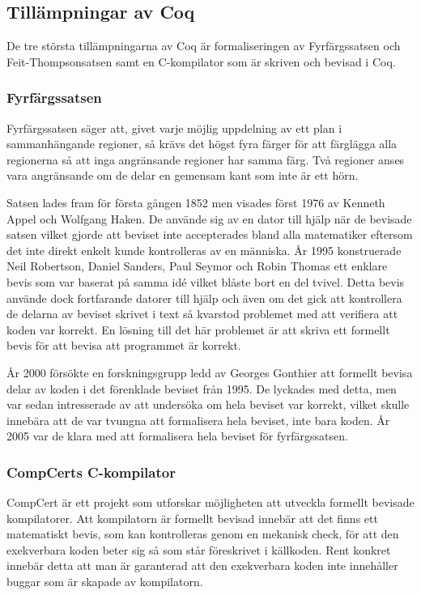 \subsection{Tillämpningar av Coq}
De tre största tillämpningarna av Coq är formaliseringen av Fyrfärgssatsen och
Feit-Thompsonsatsen samt en C-kompilator som är skriven och bevisad i Coq.

\subsubsection{Fyrfärgssatsen}
Fyrfärgssatsen\autocite{gonthier2008formal} säger att, givet varje möjlig
uppdelning av ett plan i sammanhängande regioner, så krävs det högst fyra
färger för att färglägga alla regionerna så att inga angränsande regioner har
samma färg. Två regioner anses vara angränsande om de delar en gemensam kant
som inte är ett hörn.

Satsen lades fram för första gången 1852 men visades först 1976 av Kenneth
Appel och Wolfgang Haken. De använde sig av en dator till hjälp när de bevisade
satsen vilket gjorde att beviset inte accepterades bland alla matematiker
eftersom det inte direkt enkelt kunde kontrolleras av en människa. År 1995
konstruerade Neil Robertson, Daniel Sanders, Paul Seymor och Robin Thomas ett
enklare bevis som var baserat på samma idé vilket blåste bort en del tvivel.
Detta bevis använde dock fortfarande datorer till hjälp och även om det gick
att kontrollera de delarna av beviset skrivet i text så kvarstod problemet med
att verifiera att koden var korrekt. En lösning till det här problemet är att
skriva ett formellt bevis för att bevisa att programmet är korrekt.

År 2000 försökte en forskningsgrupp ledd av Georges Gonthier att formellt
bevisa delar av koden i det förenklade beviset från 1995. De lyckades med
detta, men var sedan intresserade av att undersöka om hela beviset var korrekt,
vilket skulle innebära att de var tvungna att formalisera hela beviset, inte
bara koden. År 2005 var de klara med att formalisera hela beviset för
fyrfärgssatsen.

\subsubsection{CompCerts C-kompilator}
CompCert\autocite{compcert} är ett projekt som utforskar möjligheten att utveckla
formellt bevisade kompilatorer. Att kompilatorn är formellt bevisad innebär att
det finns ett matematiskt bevis, som kan kontrolleras genom en mekanisk check,
för att den exekverbara koden beter sig så som står föreskrivet i källkoden.
Rent konkret innebär detta att man är garanterad att den exekverbara koden inte
innehåller buggar som är skapade av kompilatorn.


